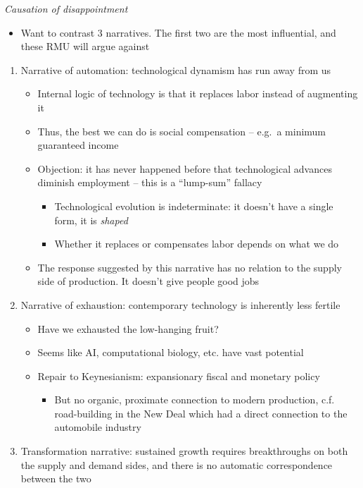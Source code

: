 \emph{Causation of disappointment}

\begin{itemize}
\tightlist
\item
  Want to contrast 3 narratives. The first two are the most influential,
  and these RMU will argue against
\end{itemize}

\begin{enumerate}
\def\labelenumi{\arabic{enumi}.}
\tightlist
\item
  Narrative of automation: technological dynamism has run away from us

  \begin{itemize}
  \tightlist
  \item
    Internal logic of technology is that it replaces labor instead of
    augmenting it
  \item
    Thus, the best we can do is social compensation -- e.g.~a minimum
    guaranteed income
  \item
    Objection: it has never happened before that technological advances
    diminish employment -- this is a ``lump-sum'' fallacy

    \begin{itemize}
    \tightlist
    \item
      Technological evolution is indeterminate: it doesn't have a single
      form, it is \emph{shaped}
    \item
      Whether it replaces or compensates labor depends on what we do
    \end{itemize}
  \item
    The response suggested by this narrative has no relation to the
    supply side of production. It doesn't give people good jobs
  \end{itemize}
\item
  Narrative of exhaustion: contemporary technology is inherently less
  fertile

  \begin{itemize}
  \tightlist
  \item
    Have we exhausted the low-hanging fruit?
  \item
    Seems like AI, computational biology, etc. have vast potential
  \item
    Repair to Keynesianism: expansionary fiscal and monetary policy

    \begin{itemize}
    \tightlist
    \item
      But no organic, proximate connection to modern production, c.f.
      road-building in the New Deal which had a direct connection to the
      automobile industry
    \end{itemize}
  \end{itemize}
\item
  Transformation narrative: sustained growth requires breakthroughs on
  both the supply and demand sides, and there is no automatic
  correspondence between the two


\end{enumerate}
